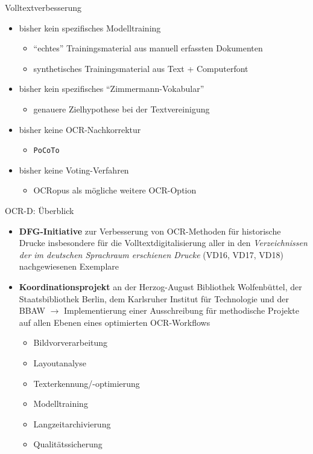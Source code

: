 \documentclass{bbawslides}
\begin{document}
\begin{bbawslide}{Volltextverbesserung}
  \vspace*{7mm}%
  \centerslidestrue%
  \begin{itemize}
    \item bisher kein spezifisches Modelltraining
    \begin{itemize}\small
      \item \enquote{echtes} Trainingsmaterial aus manuell erfassten Dokumenten
      \item synthetisches Trainingsmaterial aus Text + Computerfont
    \end{itemize}
    \item bisher kein spezifisches \enquote{Zimmermann-Vokabular}
    \begin{itemize}\small
      \item genauere Zielhypothese bei der Textvereinigung
    \end{itemize}
    \item bisher keine OCR-Nachkorrektur
    \begin{itemize}\small
      \item \texttt{PoCoTo} 
    \end{itemize}
    \item bisher keine Voting-Verfahren
    \begin{itemize}\small
      \item OCRopus als mögliche weitere OCR-Option 
    \end{itemize}
  \end{itemize}
\end{bbawslide}

\begin{bbawslide}{OCR-D: Überblick}
  \vspace*{2mm}%
  \centerslidestrue%
  \begin{itemize}
    \item \textbf{DFG-Initiative} zur Verbesserung von OCR-Methoden für historische Drucke insbesondere
          für die Volltextdigitalisierung aller in den \emph{Verzeichnissen der im deutschen
          Sprachraum erschienen Drucke} (VD16, VD17, VD18) nachgewiesenen Exemplare
    \item \textbf{Koordinationsprojekt} an der Herzog-August Bibliothek Wolfenbüttel, der Staatsbibliothek
          Berlin, dem Karlsruher Institut für Technologie und der BBAW $\rightarrow$ Implementierung
          einer Ausschreibung für methodische
          Projekte auf allen Ebenen eines optimierten OCR-Workflows
    \begin{itemize}\small
      \item Bildvorverarbeitung
      \item Layoutanalyse
      \item Texterkennung/-optimierung
      \item Modelltraining
      \item Langzeitarchivierung
      \item Qualitätssicherung
    \end{itemize}
  \end{itemize}
\end{bbawslide}
\end{document}
